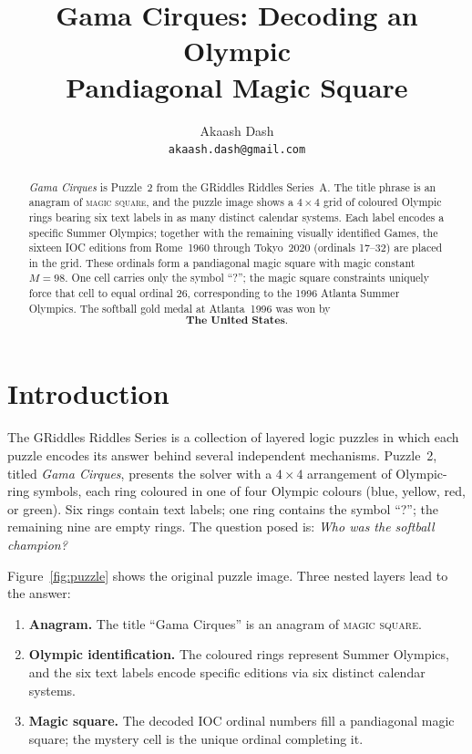 \documentclass{article}
\title{Gama Cirques: Decoding an Olympic\\
  Pandiagonal Magic Square}
\author{%
  Akaash Dash \\
  \texttt{akaash.dash@gmail.com}
}
\begin{document}
\maketitle

\begin{abstract}
\emph{Gama Cirques} is Puzzle~2 from the GRiddles Riddles
Series~A. The title phrase is an anagram of \textsc{magic square},
and the puzzle image shows a $4\times 4$ grid of coloured Olympic
rings bearing six text labels in as many distinct calendar systems.
Each label encodes a specific Summer Olympics; together with the
remaining visually identified Games, the sixteen IOC editions from
Rome~1960 through Tokyo~2020 (ordinals 17--32) are placed in the
grid.  These ordinals form a pandiagonal magic square with magic
constant $M=98$.  One cell carries only the symbol ``?''; the
magic square constraints uniquely force that cell to equal ordinal
26, corresponding to the 1996 Atlanta Summer Olympics.  The
softball gold medal at Atlanta~1996 was won by
\[
  \boxed{\textbf{The United States.}}
\]
\end{abstract}

\section{Introduction}
\label{sec:intro}

The GRiddles Riddles Series is a collection of layered logic
puzzles in which each puzzle encodes its answer behind several
independent mechanisms.  Puzzle~2, titled
\emph{Gama Cirques}, presents the solver with a $4\times 4$
arrangement of Olympic-ring symbols, each ring coloured in one of
four Olympic colours (blue, yellow, red, or green).  Six rings
contain text labels; one ring contains the symbol ``?''; the
remaining nine are empty rings.  The question posed is:
\emph{Who was the softball champion?}

Figure~\ref{fig:puzzle} shows the original puzzle image.
Three nested layers lead to the answer:
\begin{enumerate}[leftmargin=2em, itemsep=2pt]
  \item \textbf{Anagram.}  The title ``Gama Cirques'' is an
    anagram of \textsc{magic square}.
  \item \textbf{Olympic identification.}  The coloured rings
    represent Summer Olympics, and the six text labels encode
    specific editions via six distinct calendar systems.
  \item \textbf{Magic square.}  The decoded IOC ordinal numbers
    fill a pandiagonal magic square; the mystery cell is the
    unique ordinal completing it.
\end{enumerate}
\end{document}
